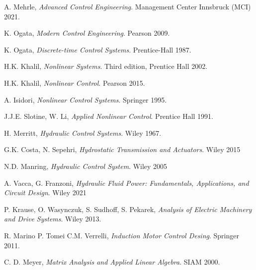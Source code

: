 \documentclass[11pt,a4paper,oneside]{book}
\numberwithin{equation}{section}
\theoremstyle{it}
\theoremstyle{definition}
\begin{document}
\begin{thebibliography}{99}
	A. Mehrle, \emph{Advanced Control Engineering}. Management Center Innsbruck (MCI) 2021.
	
	K. Ogata, \emph{Modern Control Engineering}. Pearson 2009.	
	
	K. Ogata, \emph{Discrete-time Control Systems}. Prentice-Hall 1987.
	
	H.K. Khalil, \emph{Nonlinear Systems}. Third edition, Prentice Hall 
	2002.
	
	H.K. Khalil, \emph{Nonlinear Control}. Pearson 2015.
	
	A. Isidori, \emph{Nonlinear Control Systems}. Springer 1995.
	
	J.J.E. Slotine, W. Li, \emph{Applied Nonlinear Control}. Prentice Hall 
	1991.
	
	H. Merritt, \emph{Hydraulic Control Systems}. Wiley 1967.
	
	G.K. Costa, N. Sepehri, \emph{Hydrostatic Transmission and Actuators}. 
	Wiley 2015
	
	N.D. Manring, \emph{Hydraulic Control System}. Wiley 2005
	
	A. Vacca, G. Franzoni, \emph{Hydraulic Fluid Power: Fundamentals, 
		Applications, and Circuit Design}. Wiley 2021
	
	P. Krause, O. Wasynczuk, S. Sudhoff, S. Pekarek, \emph{Analysis of Electric Machinery and Drive Systems}. Wiley 2013.
	
	R. Marino P. Tomei C.M. Verrelli, \emph{Induction Motor Control Desing}. Springer 2011.
	
	C. D. Meyer, \emph{Matrix Analysis and Applied Linear Algebra}. SIAM 2000.
\end{thebibliography}
\end{document}
